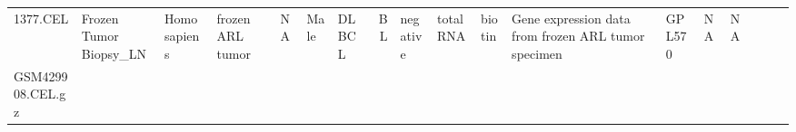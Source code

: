 \documentclass[]{article}
\begin{document}
\begin{longtable}[]{@{}lllllllrllllllllll@{}}
\begin{minipage}[t]{0.02\columnwidth}
1377.CEL\strut
\end{minipage} & \begin{minipage}[t]{0.06\columnwidth}\raggedright
Frozen Tumor Biopsy\_LN\strut
\end{minipage} & \begin{minipage}[t]{0.02\columnwidth}\raggedright
Homo sapiens\strut
\end{minipage} & \begin{minipage}[t]{0.04\columnwidth}\raggedright
frozen ARL tumor\strut
\end{minipage} & \begin{minipage}[t]{0.05\columnwidth}\raggedleft
NA\strut
\end{minipage} & \begin{minipage}[t]{0.04\columnwidth}\raggedright
Male\strut
\end{minipage} & \begin{minipage}[t]{0.06\columnwidth}\raggedright
DLBCL\strut
\end{minipage} & \begin{minipage}[t]{0.06\columnwidth}\raggedright
BL\strut
\end{minipage} & \begin{minipage}[t]{0.04\columnwidth}\raggedright
negative\strut
\end{minipage} & \begin{minipage}[t]{0.02\columnwidth}\raggedright
total RNA\strut
\end{minipage} & \begin{minipage}[t]{0.01\columnwidth}\raggedright
biotin\strut
\end{minipage} & \begin{minipage}[t]{0.08\columnwidth}\raggedright
Gene expression data from frozen ARL tumor specimen\strut
\end{minipage} & \begin{minipage}[t]{0.01\columnwidth}\raggedright
GPL570\strut
\end{minipage} & \begin{minipage}[t]{0.00\columnwidth}\raggedright
NA\strut
\end{minipage} & \begin{minipage}[t]{0.01\columnwidth}\raggedright
NA\strut
\end{minipage}\tabularnewline
\begin{minipage}[t]{0.03\columnwidth}\raggedright
GSM429908.CEL.gz\strut
\end{minipage} & \begin{minipage}[t]{0.02\columnwidth}\raggedright

\end{minipage}
\end{longtable}
\end{document}
